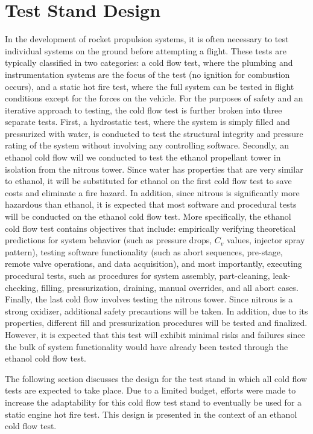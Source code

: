 \documentclass[9pt]{article} %
\numberwithin{equation}{section} %
\begin{document}
\section{Test Stand Design}
\hspace{\parindent} In the development of rocket propulsion systems, it is often necessary to test individual systems on the ground before attempting a flight. These tests are typically classified in two categories: a cold flow test, where the plumbing and instrumentation systems are the focus of the test (no ignition for combustion occurs), and a static hot fire test, where the full system can be tested in flight conditions except for the forces on the vehicle. For the purposes of safety and an iterative approach to testing, the cold flow test is further broken into three separate tests. First, a hydrostatic test, where the system is simply filled and pressurized with water, is conducted to test the structural integrity and pressure rating of the system without involving any controlling software. Secondly, an ethanol cold flow will we conducted to test the ethanol propellant tower in isolation from the nitrous tower. Since water has properties that are very similar to ethanol, it will be substituted for ethanol on the first cold flow test to save costs and eliminate a fire hazard. In addition, since nitrous is significantly more hazardous than ethanol, it is expected that most software and procedural tests will be conducted on the ethanol cold flow test. More specifically, the ethanol cold flow test contains objectives that include: empirically verifying theoretical predictions for system behavior (such as pressure drops, $C_{v}$ values, injector spray pattern), testing software functionality (such as abort sequences, pre-stage, remote valve operations, and data acquisition), and most importantly, executing procedural tests, such as procedures for system assembly, part-cleaning, leak-checking, filling, pressurization, draining, manual overrides, and all abort cases. Finally, the last cold flow involves testing the nitrous tower. Since nitrous is a strong oxidizer, additional safety precautions will be taken. In addition, due to its properties, different fill and pressurization procedures will be tested and finalized. However, it is expected that this test will exhibit minimal risks and failures since the bulk of system functionality would have already been tested through the ethanol cold flow test.

The following section discusses the design for the test stand in which all cold flow tests are expected to take place. Due to a limited budget, efforts were made to increase the adaptability for this cold flow test stand to eventually be used for a static engine hot fire test. This design is presented in the context of an ethanol cold flow test.
\end{document}
